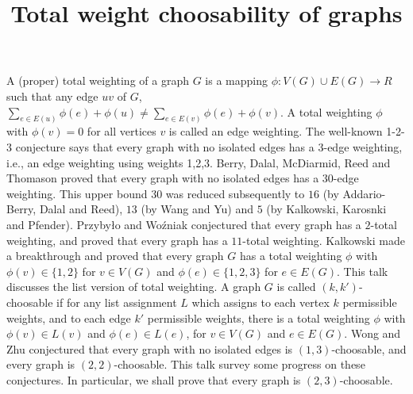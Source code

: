 \title{Total weight choosability of graphs}
\endtitle
A (proper) total weighting of a graph $G$ is a mapping
$\phi: V(G) \cup E(G) \to R$ such that any edge $uv$ of $G$,
$\sum_{e \in E(u)}\phi(e) + \phi(u) \ne \sum_{e\in E(v)}\phi(e) + \phi(v).$
A total weighting $\phi$ with $\phi(v)=0$ for all vertices $v$ is
called an   edge weighting.
The well-known 1-2-3 conjecture says that every
graph with no isolated edges has a   $3$-edge weighting,
i.e., an edge weighting using weights
1,2,3.  Berry, Dalal, McDiarmid, Reed and
Thomason proved that  every
graph with no isolated edges has a  $30$-edge weighting.
This upper bound $30$  was  reduced subsequently to $16$
(by Addario-Berry, Dalal and Reed), $
13$ (by Wang and Yu) and $5$ (by Kalkowski, Karosnki and Pfender).
Przyby{\l}o and  Wo\'{z}niak  conjectured  that every graph has a  $2$-total weighting, and
proved that every graph has a   $11$-total weighting.
Kalkowski made a breakthrough and proved that   every graph $G$
has a  total weighting $\phi$ with $\phi(v) \in \{1,2\}$ for
$v \in V(G)$ and $\phi(e) \in \{1,2,3\}$ for $e \in E(G)$.
This talk discusses the list version of total weighting. A graph $G$ is
called $(k,k')$-choosable if for any list assignment $L$ which assigns to
each vertex $k$ permissible weights, and to each edge $k'$ permissible weights, there
is a  total weighting $\phi$ with $\phi(v) \in L(v)$ and $\phi(e) \in L(e)$,
for $v \in V(G)$ and $e \in E(G)$. Wong and Zhu conjectured that every graph with no isolated edges
is $(1,3)$-choosable, and every graph is $(2,2)$-choosable. This talk survey some progress on these conjectures.
In particular, we shall prove that every graph is $(2,3)$-choosable.